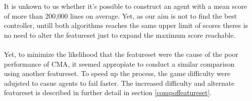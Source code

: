 It is unkown to us
whether it's possible to construct an agent 
with a mean score of more than
200,000 lines on average. 
Yet, as our aim is not to find the best controller,
untill both algorithms reaches the same upper limit 
of scores theres is no need
to alter the featureset just to
expand the maximum score reachable.\\
\\
Yet, to minimize the likelihood 
that the featureset were the cause of the 
poor performance of CMA, it seemed 
appropiate to conduct a similar comparison 
using another featureset. 
To speed up the process, the game difficulty were 
adujsted to casue agents to fail faster.
The increased difficulty and alternate
featureset is described in 
further detail in section \ref{compoffeatureset}.

